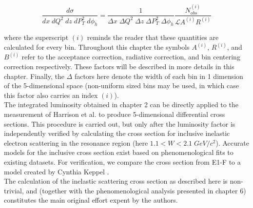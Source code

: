 \begin{equation}
	\frac{d\sigma}{dx \; dQ^2 \; dz \; dP_T^2 \; d\phi_h} = \frac{1}{\Delta x \; \Delta Q^2 \; \Delta z \; \Delta P_T^2 \; \Delta \phi_h} \frac{N_{obs}^{(i)}}{\mathcal{L} A^{(i)} R^{(i)}} 
\end{equation}

where the superscript $(i)$ reminds the reader that these quantities are calculated for every bin.  Throughout this chapter the symbols $A^{(i)}$, $R^{(i)}$, and $B^{(i)}$ refer to the acceptance correction, radiative correction, and bin centering correction respectively.  These factors will be described in more details in this chapter. Finally, the $\Delta$ factors here denote the width of each bin in 1 dimension of the 5-dimensional space (non-uniform sized bins may be used, in which case this factor also carries an index $(i)$).\\

The integrated luminosity obtained in chapter 2 can be directly applied to the measurement of Harrison et al. to produce 5-dimensional differential cross sections.  This procedure is carried out, but only after the luminosity factor is independently verified by calculating the cross section for inclusive inelastic electron scattering in the resonance region (here $1.1 < W < 2.1 \; GeV/c^2$).  Accurate models for the inclusive cross section exist based on phenomenological fits to existing datasets.  For verification, we compare the cross section from E1-F to a model created by Cynthia Keppel \cite{physics-keppel}. \\

The calculation of the inelastic scattering cross section as described here is non-trivial, and (together with the phenomenological analysis presented in chapter 6) constitutes the main original effort expent by the authors.    

